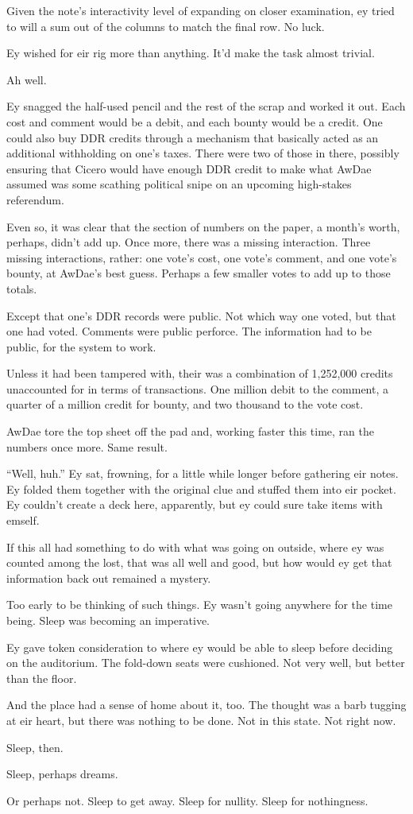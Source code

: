 Given the note's interactivity level of expanding on closer examination, ey tried to will a sum out of the columns to match the final row. No luck.

Ey wished for eir rig more than anything. It'd make the task almost trivial.

Ah well.

Ey snagged the half-used pencil and the rest of the scrap and worked it out. Each cost and comment would be a debit, and each bounty would be a credit. One could also buy DDR credits through a mechanism that basically acted as an additional withholding on one's taxes. There were two of those in there, possibly ensuring that Cicero would have enough DDR credit to make what AwDae assumed was some scathing political snipe on an upcoming high-stakes referendum.

Even so, it was clear that the section of numbers on the paper, a month's worth, perhaps, didn't add up. Once more, there was a missing interaction. Three missing interactions, rather: one vote's cost, one vote's comment, and one vote's bounty, at AwDae's best guess. Perhaps a few smaller votes to add up to those totals.

Except that one's DDR records were public. Not which way one voted, but that one had voted. Comments were public perforce. The information had to be public, for the system to work.

Unless it had been tampered with, their was a combination of 1,252,000 credits unaccounted for in terms of transactions. One million debit to the comment, a quarter of a million credit for bounty, and two thousand to the vote cost.

AwDae tore the top sheet off the pad and, working faster this time, ran the numbers once more. Same result.

``Well, huh.'' Ey sat, frowning, for a little while longer before gathering eir notes. Ey folded them together with the original clue and stuffed them into eir pocket. Ey couldn't create a deck here, apparently, but ey could sure take items with emself.

If this all had something to do with what was going on outside, where ey was counted among the lost, that was all well and good, but how would ey get that information back out remained a mystery.

Too early to be thinking of such things. Ey wasn't going anywhere for the time being. Sleep was becoming an imperative.

Ey gave token consideration to where ey would be able to sleep before deciding on the auditorium. The fold-down seats were cushioned. Not very well, but better than the floor.

And the place had a sense of home about it, too. The thought was a barb tugging at eir heart, but there was nothing to be done. Not in this state. Not right now.

Sleep, then.

Sleep, perhaps dreams.

Or perhaps not. Sleep to get away. Sleep for nullity. Sleep for nothingness.
